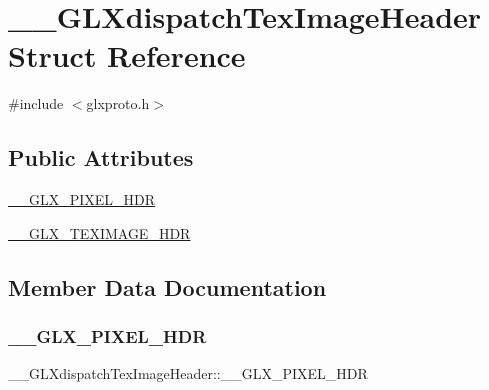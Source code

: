 \hypertarget{struct_____g_l_xdispatch_tex_image_header}{}\section{\+\_\+\+\_\+\+G\+L\+Xdispatch\+Tex\+Image\+Header Struct Reference}
\label{struct_____g_l_xdispatch_tex_image_header}


{\ttfamily \#include $<$glxproto.\+h$>$}

\subsection*{Public Attributes}
\begin{DoxyCompactItemize}
\item 
\hyperlink{struct_____g_l_xdispatch_tex_image_header_a405d864676fc61afe3d78d08bc14da36}{\+\_\+\+\_\+\+G\+L\+X\+\_\+\+P\+I\+X\+E\+L\+\_\+\+H\+DR}
\item 
\hyperlink{struct_____g_l_xdispatch_tex_image_header_a23566735af174281c17902d5cab59e0d}{\+\_\+\+\_\+\+G\+L\+X\+\_\+\+T\+E\+X\+I\+M\+A\+G\+E\+\_\+\+H\+DR}
\end{DoxyCompactItemize}


\subsection{Member Data Documentation}
\mbox{\label{struct_____g_l_xdispatch_tex_image_header_a405d864676fc61afe3d78d08bc14da36}} 
\subsubsection{\texorpdfstring{\+\_\+\+\_\+\+G\+L\+X\+\_\+\+P\+I\+X\+E\+L\+\_\+\+H\+DR}{\_\_GLX\_PIXEL\_HDR}}
{\footnotesize\ttfamily \+\_\+\+\_\+\+G\+L\+Xdispatch\+Tex\+Image\+Header\+::\+\_\+\+\_\+\+G\+L\+X\+\_\+\+P\+I\+X\+E\+L\+\_\+\+H\+DR}

